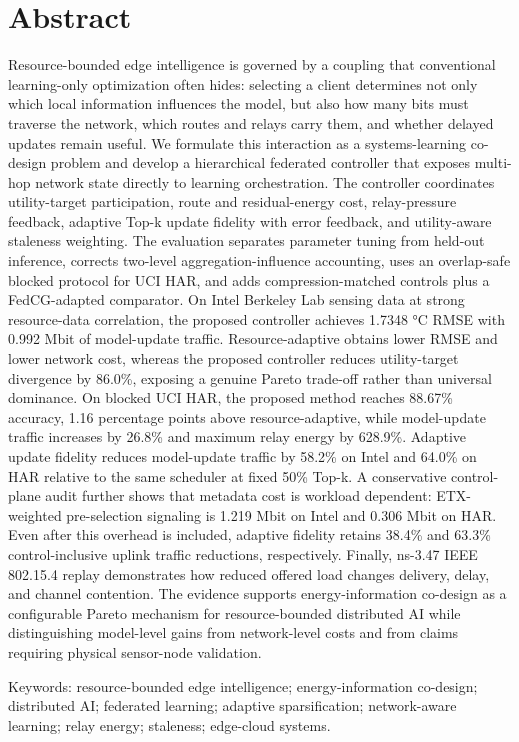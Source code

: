 \documentclass[11pt]{article}
\begin{document}
\section*{Abstract}
Resource-bounded edge intelligence is governed by a coupling that conventional learning-only optimization often hides: selecting a client determines not only which local information influences the model, but also how many bits must traverse the network, which routes and relays carry them, and whether delayed updates remain useful. We formulate this interaction as a systems-learning co-design problem and develop a hierarchical federated controller that exposes multi-hop network state directly to learning orchestration. The controller coordinates utility-target participation, route and residual-energy cost, relay-pressure feedback, adaptive Top-k update fidelity with error feedback, and utility-aware staleness weighting. The evaluation separates parameter tuning from held-out inference, corrects two-level aggregation-influence accounting, uses an overlap-safe blocked protocol for UCI HAR, and adds compression-matched controls plus a FedCG-adapted comparator. On Intel Berkeley Lab sensing data at strong resource-data correlation, the proposed controller achieves 1.7348 °C RMSE with 0.992 Mbit of model-update traffic. Resource-adaptive obtains lower RMSE and lower network cost, whereas the proposed controller reduces utility-target divergence by 86.0\%, exposing a genuine Pareto trade-off rather than universal dominance. On blocked UCI HAR, the proposed method reaches 88.67\% accuracy, 1.16 percentage points above resource-adaptive, while model-update traffic increases by 26.8\% and maximum relay energy by 628.9\%. Adaptive update fidelity reduces model-update traffic by 58.2\% on Intel and 64.0\% on HAR relative to the same scheduler at fixed 50\% Top-k. A conservative control-plane audit further shows that metadata cost is workload dependent: ETX-weighted pre-selection signaling is 1.219 Mbit on Intel and 0.306 Mbit on HAR. Even after this overhead is included, adaptive fidelity retains 38.4\% and 63.3\% control-inclusive uplink traffic reductions, respectively. Finally, ns-3.47 IEEE 802.15.4 replay demonstrates how reduced offered load changes delivery, delay, and channel contention. The evidence supports energy-information co-design as a configurable Pareto mechanism for resource-bounded distributed AI while distinguishing model-level gains from network-level costs and from claims requiring physical sensor-node validation.\par
Keywords: resource-bounded edge intelligence; energy-information co-design; distributed AI; federated learning; adaptive sparsification; network-aware learning; relay energy; staleness; edge-cloud systems.\par
\end{document}
